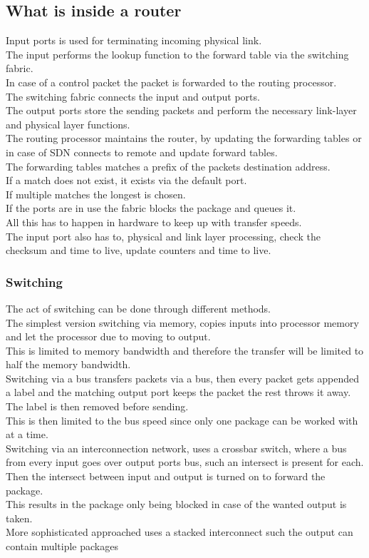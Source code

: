 \documentclass[12pt, a4paper]{article}
\begin{document}
		\subsection{What is inside a router}
			Input ports is used for terminating incoming physical link.\\
			The input performs the lookup function to the forward table via the switching fabric.\\
			In case of a control packet the packet is forwarded to the routing processor.\\
			The switching fabric connects the input and output ports.\\
			The output ports store the sending packets and perform the necessary link-layer and physical layer functions.\\
			The routing processor maintains the router, by updating the forwarding tables or in case of SDN connects to remote and update forward tables.\\
			The forwarding tables matches a prefix of the packets destination address.\\
			If a match does not exist, it exists via the default port.\\
			If multiple matches the longest is chosen.\\
			If the ports are in use the fabric blocks the package and queues it.\\
			All this has to happen in hardware to keep up with transfer speeds.\\
			The input port also has to, physical and link layer processing, check the checksum and time to live, update counters and time to live.\\
			\subsubsection{Switching}
				The act of switching can be done through different methods.\\
				The simplest version switching via memory, copies inputs into processor memory and let the processor due to moving to output.\\
				This is limited to memory bandwidth and therefore the transfer will be limited to half the memory bandwidth.\\
				Switching via a bus transfers packets via a bus, then every packet gets appended a label and the matching output port keeps the packet the rest throws it away.\\
				The label is then removed before sending.\\
				This is then limited to the bus speed since only one package can be worked with at a time.\\
				Switching via an interconnection network, uses a crossbar switch, where a bus from every input goes over output ports bus, such an intersect is present for each.\\
				Then the intersect between input and output is turned on to forward the package.\\
				This results in the package only being blocked in case of the wanted output is taken.\\
				More sophisticated approached uses a stacked interconnect such the output can contain multiple packages
\end{document}
